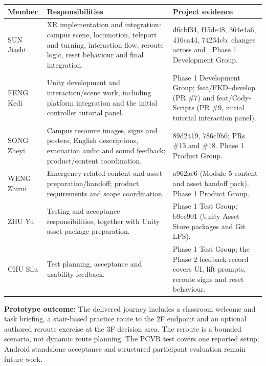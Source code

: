 \documentclass[12pt,a4paper]{article}
\newcommand{\code}[1]{\textnormal{#1}}
\begin{document}
\begin{tabularx}{\textwidth}{@{}p{2.4cm}YY@{}}
\toprule
\textbf{Member} & \textbf{Responsibilities} & \textbf{Project evidence} \\
\midrule
SUN Jiashi &
XR implementation and integration: campus scene, locomotion, teleport and
turning, interaction flow, reroute logic, reset behaviour and final integration. &
\code{d6cbf34}, \code{f15de48}, \code{364e4a6}, \code{416ca44},
\code{74234cb}; changes across  and
. Phase 1 Development Group. \\
FENG Kedi &
Unity development and interaction/scene work, including platform integration
and the initial controller tutorial panel. &
Phase 1 Development Group; \code{feat/FKD--develop} (PR \#7) and
\code{feat/Cody-Scripts} (PR \#9, initial tutorial interaction panel). \\
SONG Zheyi &
Campus resource images, signs and posters, English descriptions, evacuation
audio and sound feedback; product/content coordination. &
\code{89d2419}, \code{786c9b6}; PRs \#13 and \#18. Phase 1 Product Group. \\
WENG Zhirui &
Emergency-related content and asset preparation/handoff; product requirements
and scope coordination. &
\code{a962ae6} (Module 5 content and asset handoff pack). Phase 1 Product Group. \\
ZHU Yu &
Testing and acceptance responsibilities, together with Unity asset-package
preparation. &
Phase 1 Test Group; \code{b9ee901} (Unity Asset Store packages and Git LFS). \\
CHU Silu &
Test planning, acceptance and usability feedback. &
Phase 1 Test Group; the Phase 2 feedback record covers UI, lift prompts,
reroute signs and reset behaviour. \\
\bottomrule
\end{tabularx}

\textbf{Prototype outcome:} The delivered journey includes a classroom welcome
and task briefing, a stair-based practice route to the 2F endpoint and an
optional authored reroute exercise at the 3F decision area. The reroute is a
bounded scenario, not dynamic route planning. The PCVR test covers one
reported setup; Android standalone acceptance and structured participant
evaluation remain future work.
\end{document}
